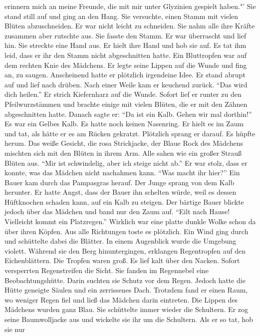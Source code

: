 \documentclass[prd,12pt,tightenlines,notitlepage,nofootinbib]{revtex4-1}
\begin{document}
erinnern mich an meine Freunde, die mit mir unter Glyzinien gespielt
haben."'  Sie stand still auf und ging an den Hang.  Sie versuchte,
einen Stamm mit vielen Blüten abzuschneiden.  Er war nicht leicht
zu schneiden.  Sie nahm alle ihre Kräfte zusammen aber rutschte aus.
Sie fasste den Stamm.  Er war überrascht und lief hin.  Sie streckte
eine Hand aus.  Er hielt ihre Hand und hob sie auf.  Es tat ihm leid,
dass er ihr den Stamm nicht abgeschnitten hatte.  Ein Bluttropfen war auf
dem rechten Knie des Mädchens.  Er legte seine Lippen auf die Wunde und fing an,
zu saugen.  Anscheinend hatte er plötzlich irgendeine Idee.  Er stand abrupt auf
und lief nach drüben.  Nach einer Weile kam er keuchend zurück.  "`Das
wird dich heilen."'  Er strich Kiefernharz auf die Wunde.  Sofort
lief er runter zu den Pfeilwurzstämmen und brachte einige mit vielen
Blüten, die er mit den Zähnen abgeschnitten hatte.  Danach sagte er: "`Da ist ein Kalb.
Gehen wir mal dorthin!"'  Es war ein Gelbes Kalb.  Es hatte noch keinen
Nasenring.  Er hielt es im Zaum und tat, als hätte er es am Rücken
gekratzt.  Plötzlich sprang er darauf.  Es hüpfte herum.
Das weiße Gesicht, die rosa Strickjacke, der Blaue Rock des
Mädchens mischten sich mit den Blüten in ihrem Arm.  Alle sahen wie
ein großer Strauß Blüten aus.  "`Mir ist schwindelig, aber ich steige nicht
ab."'  Er war stolz, dass er konnte, was das Mädchen nicht nachahmen kann.
"`Was macht ihr hier?"'  Ein Bauer kam durch das Pampasgras herauf.  Der
Junge sprang von dem Kalb herunter.  Er hatte Angst, dass der Bauer ihn schelten
würde, weil es dessen Hüftknochen schaden kann, auf ein Kalb zu steigen.  Der
bärtige Bauer blickte jedoch über das Mädchen und band nur den Zaum
auf.  "`Eilt nach Hause!  Vielleicht kommt ein Platzregen."'  Wirklich
war eine platte dunkle Wolke schon da über ihren Köpfen. Aus alle
Richtungen toste es plötzlich.  Ein Wind ging durch und
schüttelte dabei die Blätter.  In einem Augenblick wurde die Umgebung violett.
Während sie den Berg hinuntergingen, erklangen Regentropfen
auf den Eichenblättern.
Die Tropfen waren groß.  Es lief kalt über den Nacken. %
Sofort versperrten Regenstreifen die Sicht.  Sie fanden im
Regennebel eine Beobachtungshütte.  Darin suchten sie Schutz vor dem Regen.
Jedoch hatte die Hütte geneigte Säulen und ein zerrissenes
Dach.  Trotzdem fand er einen Raum, wo weniger Regen fiel und ließ das Mädchen
darin eintreten.  Die Lippen des Mädchens wurden ganz Blau.
Sie schüttelte immer wieder die Schultern.  Er zog seine Baumwolljacke
aus und wickelte sie ihr um die Schultern.  Als er so tat, hob sie nur
\end{document}

